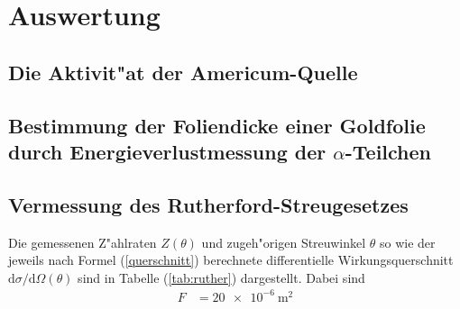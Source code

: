 \section{Auswertung}
\label{sec:Auswertung}

\subsection{Die Aktivit"at der Americum-Quelle}


\subsection{\texorpdfstring{Bestimmung der Foliendicke einer Goldfolie durch Energieverlustmessung der $\alpha$-Teilchen}{Bestimmung der Foliendicke einer Goldfolie durch Energieverlustmessung der alpha-Teilchen}}





\subsection{Vermessung des Rutherford-Streugesetzes}
  Die gemessenen Z"ahlraten $Z(\theta)$ und zugeh"origen Streuwinkel $\theta$ so wie der jeweils nach Formel (\ref{querschnitt}) berechnete differentielle Wirkungsquerschnitt $\text{d}\sigma/\text{d}\Omega(\theta)$ sind in Tabelle (\ref{tab:ruther}) dargestellt.
  Dabei sind
  \begin{align*}
    F &= \SI{20e-6}{\meter \squared} \\
  \end{align*}


